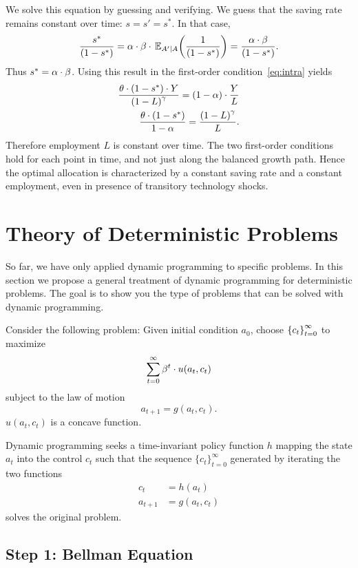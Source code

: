 \documentclass[letterpaper,12pt,leqno]{article}
\begin{document}
We solve this equation by guessing and verifying. We guess that the saving rate remains constant over time: $s=s'=s^*$. In that case, 
\begin{align*}
\frac{s^*}{\bp{1-s^*}}=\a\cdot \b \cdot \E[A'|A]{\frac{1}{\bp{1-s^*}}}=\frac{\a\cdot \b}{\bp{1-s^*} }.
\end{align*}
Thus $s^* =\alpha\cdot \beta$. Using this result in the first-order condition~\eqref{eq:intra} yields
\begin{align*}
\frac{\theta \cdot \left( 1-s^* \right) \cdot Y}{\left( 1-L \right)^{\gamma}} =\left( 1-\alpha \right)\cdot \frac{Y}{L}\\
\frac{\theta \cdot \left( 1-s^* \right)}{1-\alpha} = \frac{\left( 1-L \right)^{\gamma}}{L}.
\end{align*}
Therefore employment $L$ is constant over time. The two first-order conditions hold for each point in time, and not just along the balanced growth path. Hence the optimal allocation is characterized by a constant saving rate and a constant employment, even in presence of transitory technology shocks.


\section{Theory of Deterministic Problems}\label{sec:theory}

So far, we have only applied dynamic programming to specific problems. In this section we propose a general treatment of dynamic programming for deterministic problems. The goal is to show you the type of problems that can be solved with dynamic programming.

Consider the following problem: Given initial condition $a_{0}$, choose $\left\lbrace c_{t} \right\rbrace_{t=0}^{\infty}$ to maximize
\begin{align*}
\sum_{t=0}^{\infty}\beta^{t}\cdot u(a_{t},c_{t})
\end{align*}
subject to the law of motion
\[a_{t+1}=g(a_{t},c_{t}).\]
$u(a_{t},c_{t})$ is a concave function. 

Dynamic programming seeks a time-invariant policy function $h$ mapping the state $a_{t}$  into the control $c_{t}$  such that the sequence
$\{c_{t}\}_{t=0}^{\infty}$ generated by iterating the two functions
\begin{align*}
c_{t} & =h(a_{t}) \\
a_{t+1} & =g(a_{t},c_{t})
\end{align*}
solves the original problem.

\subsection{Step 1: Bellman Equation}
\end{document}
